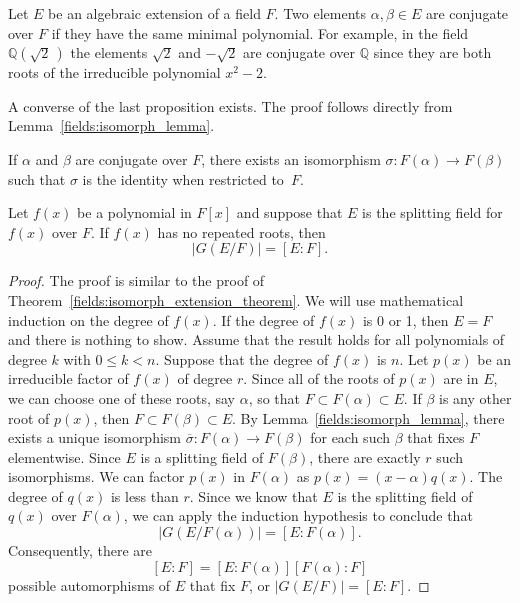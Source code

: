 \medskip
 
Let $E$ be an algebraic extension of a field $F$.  Two elements $\alpha, \beta \in E$ are {\bfi conjugate\/} over $F$ if they have the same minimal polynomial. For example, in the field ${\mathbb Q}( \sqrt{2}\, )$ the elements $\sqrt{2}$ and $-\sqrt{2}$ are conjugate over ${\mathbb Q}$ since they are both roots of the irreducible polynomial $x^2 - 2$.  
 
A converse of the last proposition exists. The proof follows directly from Lemma~\ref{fields:isomorph_lemma}. 

\begin{proposition}
If $\alpha$ and $\beta$ are conjugate over $F$, there exists an isomorphism $\sigma : F( \alpha ) \rightarrow F( \beta )$ such that $\sigma$ is the identity when restricted to~$F$.
\end{proposition}

\begin{theorem}\label{galois:extension_order_theorem}
Let $f(x)$ be a polynomial in $F[x]$ and suppose that $E$ is the splitting field for $f(x)$ over $F$.  If $f(x)$ has no repeated roots, then 
\[
|G(E/F)| = [E:F].
\]
\end{theorem}
 
\begin{proof}
The proof is similar to the proof of Theorem~\ref{fields:isomorph_extension_theorem}.  We will use mathematical induction on the degree of $f(x)$.  If the degree of $f(x)$ is 0 or 1, then $E = F$ and there is nothing to show.  Assume
that the result holds for all polynomials of degree $k$ with $0 \leq k < n$.  Suppose that the degree of $f(x)$ is $n$.  Let $p(x)$ be an irreducible factor of $f(x)$ of degree $r$.  Since all of the roots of $p(x)$ are in $E$, we can choose one of
these roots, say $\alpha$, so that $F \subset F( \alpha ) \subset E$.  If $\beta$ is any other root of $p(x)$, then $F \subset F( \beta ) \subset E$.  By Lemma~\ref{fields:isomorph_lemma}, there exists a unique isomorphism $\overline{\sigma}: F( \alpha ) \rightarrow F( \beta )$ for each such $\beta$ that fixes $F$ elementwise.  Since $E$ is a splitting field of $F(\beta)$, there are exactly $r$ such isomorphisms.  We can factor
$p(x)$ in $F(\alpha)$ as $p(x) = (x - \alpha) q(x)$.  The degree of $q(x)$ is less than $r$.  Since we know that $E$ is the  splitting field of $q(x)$ over $F(\alpha)$, we can apply
the induction  hypothesis to conclude that 
\[
|G(E/F(\alpha))| = [E:F(\alpha)].
\]
Consequently, there are
\[
[E:F] = [E:F(\alpha)] [F( \alpha):F]
\]
possible automorphisms of $E$ that fix $F$, or $|G(E/F)| = [E:F]$.
\end{proof}

